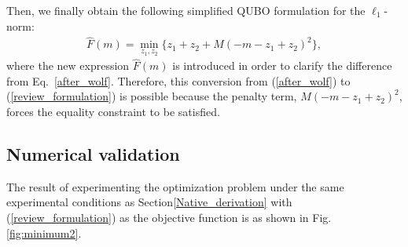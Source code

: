 \documentclass[fp,twocolumn]{jpsj3}
\begin{document}

Then, we finally obtain the following simplified QUBO formulation for the $\ell_{1}$-norm:
\begin{align}
\widehat{F}(m) = \min_{z_{1},z_{2}}{\{z_{1}+z_{2}+M(-m-z_{1}+z_{2})^{2}\}, \label{review_formulation}}
\end{align}
where the new expression $\widehat{F}(m)$ is introduced in order to clarify the difference from Eq.~\eqref{after_wolf}.
Therefore, this conversion from (\ref{after_wolf}) to (\ref{review_formulation}) is possible because the penalty term, $M(-m-z_{1}+z_{2})^{2}$, forces the equality constraint to be satisfied.


\subsection{Numerical validation} %
The result of experimenting the optimization problem under the same experimental conditions as Section\ref{Native_derivation} with (\ref{review_formulation}) as the objective function is as shown in Fig.\ref{fig:minimum2}.
\end{document}
